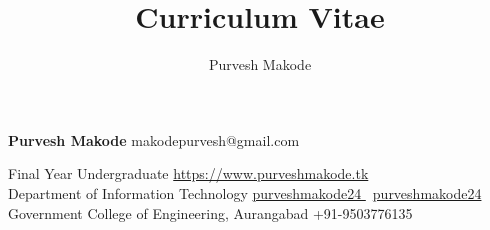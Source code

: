 \documentclass[9pt]{extarticle}
\title{Curriculum Vitae}
\author{Purvesh Makode}
\begin{document}

\begingroup
{}

{\Huge\textbf{\sc Purvesh Makode}}
\hfill
makodepurvesh@gmail.com \faEnvelope


Final Year Undergraduate
\hfill
\href{https://www.purveshmakode.tk}{https://www.purveshmakode.tk \faHome}\\

Department of Information Technology
\hfill
\href{https://github.com/purveshmakode24}{purveshmakode24 \faGithub} \textbar \ 
\href{https://www.linkedin.com/in/purveshmakode24/}{purveshmakode24 \faLinkedin} \\

Government College of Engineering, Aurangabad
\hfill
+91-9503776135 \faMobile \\
\vspace{6mm}

\begin{minipage}[t]{0.48\textwidth}
  \vspace{4mm}
  
  \vspace{3mm}
  
\end{minipage}
\hfill
\begin{minipage}[t]{0.48\textwidth}
  \vspace{4mm}
  
  \vspace{1mm}
  
%   
  \vspace{3mm}
  
  \vspace{3mm}
%   
  
\end{minipage}
\vspace{4mm}


\endgroup
\end{document}
